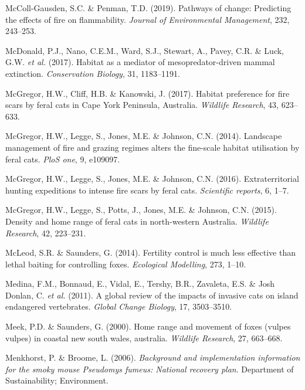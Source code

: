 \documentclass[11pt,a4paper,titlepage,twoside,openright]{style/unimelbthesis}
\begin{document}
\begin{mainmatter}
\leavevmode\hypertarget{ref-mccollgausden2019pathways}{}%
McColl-Gausden, S.C. \& Penman, T.D. (2019). Pathways of change: Predicting the effects of fire on flammability. \emph{Journal of Environmental Management}, 232, 243--253.

\leavevmode\hypertarget{ref-mcdonald2017habitat}{}%
McDonald, P.J., Nano, C.E.M., Ward, S.J., Stewart, A., Pavey, C.R. \& Luck, G.W. \emph{et al.} (2017). Habitat as a mediator of mesopredator-driven mammal extinction. \emph{Conservation Biology}, 31, 1183--1191.

\leavevmode\hypertarget{ref-mcgregor2017habitat}{}%
McGregor, H.W., Cliff, H.B. \& Kanowski, J. (2017). Habitat preference for fire scars by feral cats in Cape York Peninsula, Australia. \emph{Wildlife Research}, 43, 623--633.

\leavevmode\hypertarget{ref-mcgregor2014landscape}{}%
McGregor, H.W., Legge, S., Jones, M.E. \& Johnson, C.N. (2014). Landscape management of fire and grazing regimes alters the fine-scale habitat utilisation by feral cats. \emph{PloS one}, 9, e109097.

\leavevmode\hypertarget{ref-mcgregor2016extraterritorial}{}%
McGregor, H.W., Legge, S., Jones, M.E. \& Johnson, C.N. (2016). Extraterritorial hunting expeditions to intense fire scars by feral cats. \emph{Scientific reports}, 6, 1--7.

\leavevmode\hypertarget{ref-mcgregor2015density}{}%
McGregor, H.W., Legge, S., Potts, J., Jones, M.E. \& Johnson, C.N. (2015). Density and home range of feral cats in north-western Australia. \emph{Wildlife Research}, 42, 223--231.

\leavevmode\hypertarget{ref-mcleod2014fertility}{}%
McLeod, S.R. \& Saunders, G. (2014). Fertility control is much less effective than lethal baiting for controlling foxes. \emph{Ecological Modelling}, 273, 1--10.

\leavevmode\hypertarget{ref-medina2011global}{}%
Medina, F.M., Bonnaud, E., Vidal, E., Tershy, B.R., Zavaleta, E.S. \& Josh Donlan, C. \emph{et al.} (2011). A global review of the impacts of invasive cats on island endangered vertebrates. \emph{Global Change Biology}, 17, 3503--3510.

\leavevmode\hypertarget{ref-meek2000home}{}%
Meek, P.D. \& Saunders, G. (2000). Home range and movement of foxes (vulpes vulpes) in coastal new south wales, australia. \emph{Wildlife Research}, 27, 663--668.

\leavevmode\hypertarget{ref-menkhorst2006background}{}%
Menkhorst, P. \& Broome, L. (2006). \emph{Background and implementation information for the smoky mouse Pseudomys fumeus: National recovery plan}. Department of Sustainability; Environment.


\end{mainmatter}
\end{document}
